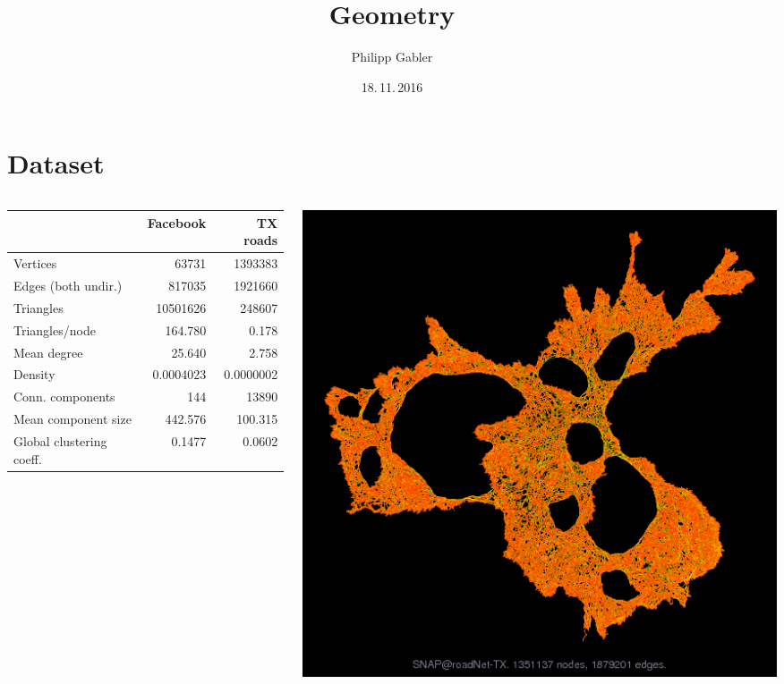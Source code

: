 \documentclass{beamer}
\author{Philipp Gabler}
\title{Geometry}
\date{18.\,11.\,2016}
\begin{document}
\beamertemplatenavigationsymbolsempty

\section{Dataset}
\begin{frame}
  \begin{columns}
    \begin{column}{0.7\textwidth}
      \small
      \begin{tabular}{lrr}
        \toprule
        & Facebook\footnotemark & TX roads\footnotemark \\
        \midrule
        Vertices & 63731 & 1393383 \\
        Edges (both undir.) & 817035 & 1921660 \\
        Triangles & 10501626 & 248607 \\
        Triangles/node & 164.780 & 0.178 \\
        Mean degree & 25.640 & 2.758 \\
        Density & 0.0004023 & 0.0000002 \\
        Conn. components & 144 & 13890 \\
        Mean component size & 442.576 & 100.315 \\
        Global clustering coeff. & 0.1477 & 0.0602 \\
        \bottomrule
      \end{tabular}
    \end{column}
    \begin{column}{0.3\textwidth}
      \includegraphics[width=\textwidth]{fig/texas-image}
    \end{column}
  \end{columns}


\end{frame}
\end{document}
